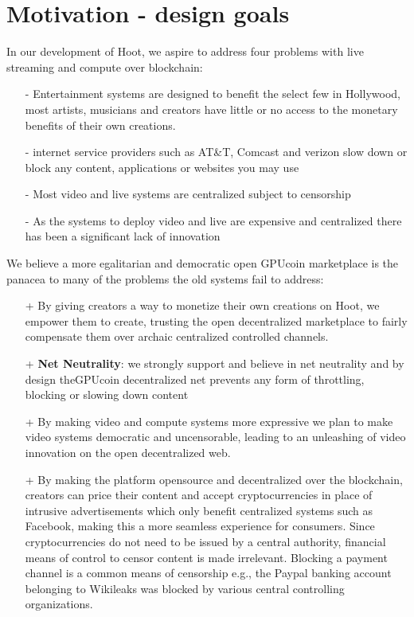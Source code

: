 \documentclass{article}
\begin{document}
\section{Motivation - design goals}
In our development of Hoot, we aspire to address four problems with live streaming and compute over blockchain:
\begin{itemize}
\item[-]Entertainment systems are designed to benefit the select few in Hollywood, most artists, musicians and creators have little or no access to the monetary benefits of their own creations.
\item[-]internet service providers such as AT\&T, Comcast and verizon slow down or block any content, applications or websites you may use
\item[-]Most video and live systems are centralized subject to censorship

\item[-]As the systems to deploy video and live are expensive and centralized there has been a significant lack of innovation

\end{itemize}


We believe a more egalitarian and democratic open GPUcoin marketplace is the panacea to many of the problems the old systems fail to address:
\begin{itemize}
\item[+]By giving creators a way to monetize their own creations on Hoot, we empower them to create, trusting the open decentralized marketplace to fairly compensate them over archaic centralized controlled channels.
\item[+]\textbf{Net Neutrality}: we strongly support and believe in net neutrality and by design theGPUcoin decentralized net prevents any form of throttling, blocking or slowing down content

\item[+]By making video and compute systems more expressive we plan to make video systems democratic and uncensorable, leading to an unleashing of video innovation on the open decentralized web.

\item[+]By making the platform opensource and decentralized over the blockchain, creators can price their content and accept cryptocurrencies in place of intrusive advertisements which only benefit centralized systems such as Facebook, making this a more seamless experience for consumers. Since cryptocurrencies do not need to be issued by a central authority, financial means of control to censor content is made irrelevant. Blocking a payment channel is a common means of censorship e.g., the Paypal banking account belonging to Wikileaks was blocked by various central controlling organizations.
\end{itemize}
\end{document}
